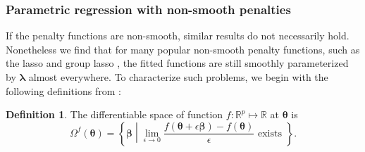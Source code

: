 \documentclass[12pt]{article} %
\theoremstyle{definition}
\newtheorem{definition}{Definition}
\begin{document}
\subsubsection{Parametric regression with non-smooth penalties}
\label{sec:param_nonsmooth}

If the penalty functions are non-smooth, similar results do not necessarily hold. Nonetheless we find that for many popular non-smooth penalty functions, such as the lasso \citep{tibshirani1996regression} and group lasso \citep{yuan2006model}, the fitted functions are still smoothly parameterized by $\boldsymbol \lambda$ almost everywhere.
To characterize such problems, we begin with the following definitions from \citet{feng2017gradient}:

\begin{definition}
	The differentiable space of function $f:\mathbb{R}^p \mapsto \mathbb{R}$ at $\boldsymbol{\theta}$ is
	\begin{equation}
	\Omega^{f}(\boldsymbol{\theta}) = \left \{ \boldsymbol{\beta} \middle | \lim_{\epsilon \rightarrow 0} \frac{f(\boldsymbol{\theta} + \epsilon \boldsymbol{\beta}) - f(\boldsymbol{\theta})}{\epsilon} \text{ exists } \right \}.
	\end{equation}
\end{definition}
\end{document}
